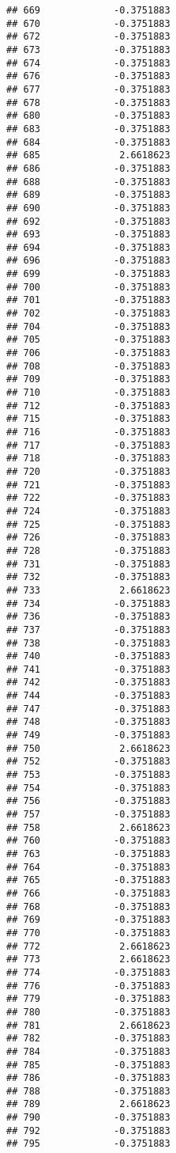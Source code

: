 \documentclass[
]{article}
\begin{document}
\begin{verbatim}
## 669             -0.3751883
## 670             -0.3751883
## 672             -0.3751883
## 673             -0.3751883
## 674             -0.3751883
## 676             -0.3751883
## 677             -0.3751883
## 678             -0.3751883
## 680             -0.3751883
## 683             -0.3751883
## 684             -0.3751883
## 685              2.6618623
## 686             -0.3751883
## 688             -0.3751883
## 689             -0.3751883
## 690             -0.3751883
## 692             -0.3751883
## 693             -0.3751883
## 694             -0.3751883
## 696             -0.3751883
## 699             -0.3751883
## 700             -0.3751883
## 701             -0.3751883
## 702             -0.3751883
## 704             -0.3751883
## 705             -0.3751883
## 706             -0.3751883
## 708             -0.3751883
## 709             -0.3751883
## 710             -0.3751883
## 712             -0.3751883
## 715             -0.3751883
## 716             -0.3751883
## 717             -0.3751883
## 718             -0.3751883
## 720             -0.3751883
## 721             -0.3751883
## 722             -0.3751883
## 724             -0.3751883
## 725             -0.3751883
## 726             -0.3751883
## 728             -0.3751883
## 731             -0.3751883
## 732             -0.3751883
## 733              2.6618623
## 734             -0.3751883
## 736             -0.3751883
## 737             -0.3751883
## 738             -0.3751883
## 740             -0.3751883
## 741             -0.3751883
## 742             -0.3751883
## 744             -0.3751883
## 747             -0.3751883
## 748             -0.3751883
## 749             -0.3751883
## 750              2.6618623
## 752             -0.3751883
## 753             -0.3751883
## 754             -0.3751883
## 756             -0.3751883
## 757             -0.3751883
## 758              2.6618623
## 760             -0.3751883
## 763             -0.3751883
## 764             -0.3751883
## 765             -0.3751883
## 766             -0.3751883
## 768             -0.3751883
## 769             -0.3751883
## 770             -0.3751883
## 772              2.6618623
## 773              2.6618623
## 774             -0.3751883
## 776             -0.3751883
## 779             -0.3751883
## 780             -0.3751883
## 781              2.6618623
## 782             -0.3751883
## 784             -0.3751883
## 785             -0.3751883
## 786             -0.3751883
## 788             -0.3751883
## 789              2.6618623
## 790             -0.3751883
## 792             -0.3751883
## 795             -0.3751883

\end{verbatim}
\end{document}
